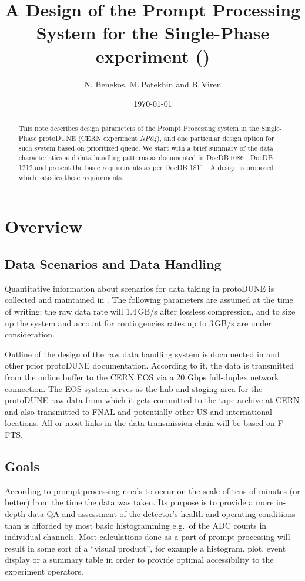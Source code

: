\documentclass[pdftex,12pt,letter]{article}
\title{A Design of the Prompt Processing System for the Single-Phase \pd experiment (\expname)}
\date{\today}
\author{N. Benekos, M.\,Potekhin and B.\,Viren}
\newcommand{\pd}{protoDUNE\xspace}
\newcommand{\expname}{\textit{NP04}\xspace}
\begin{document}
\maketitle

\begin{abstract}
\noindent  This note describes design parameters of
the Prompt Processing system in the Single-Phase \pd
(CERN experiment \expname), and one particular design option for such system
based on prioritized queue. We start with a brief summary of the data characteristics and data handling patterns
as documented in DocDB\,1086 \cite{docdb1086}, DocDB\,1212 \cite{docdb1212} and present
the basic requirements as per  DocDB 1811 \cite{docdb1811}. A design is proposed which satisfies 
these requirements.
\end{abstract}


\section{Overview}
\subsection{Data Scenarios and Data Handling}
\label{sec:rawdata}
Quantitative information about scenarios for data taking in \pd is collected and maintained in \cite{docdb1086}. The following parameters
are assumed at the time of writing: the raw data rate will 1.4\,GB/s after lossless compression, and to size up
the system and account for contingencies rates up to 3\,GB/s are under consideration.

Outline of the design of the raw data handling system is documented in  \cite{docdb1212} and other prior \pd documentation.
According to it, the data is transmitted from the online buffer to the CERN EOS via a 20 Gbps full-duplex network connection.
The EOS system serves as the hub and staging area for the \pd raw data from which
it gets committed to the tape archive at CERN and also transmitted to FNAL and potentially
other US and international locations. All or most links in the data transmission chain will be based on F-FTS.

\subsection{Goals}
\label{sec:outline}
According to \cite{docdb1811}  prompt processing needs to occur on the scale
of tens of minutes (or better) from the time the data was taken. Its purpose is to
provide a more in-depth data QA and assessment of the detector's health and operating conditions
than is afforded by most basic histogramming e.g.~of the ADC counts in individual channels. Most calculations
done as a part of prompt processing will result in some sort of a ``visual product'', for example a histogram,
plot, event display or a summary table in order to provide optimal accessibility to the experiment
operators.
\end{document}
